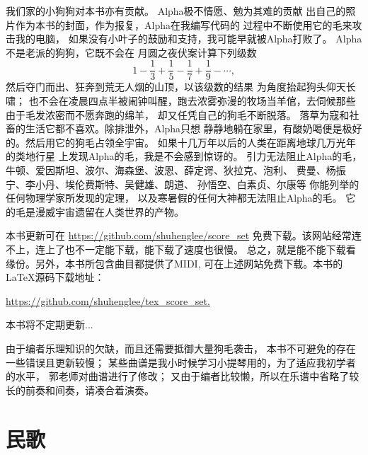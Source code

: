 \documentclass[a4paper,twoside]{memoir}
\begin{document}
我们家的小狗狗对本书亦有贡献。
Alpha极不情愿、勉为其难的贡献
出自己的照片作为本书的封面，作为报复，Alpha在我编写代码的
过程中不断使用它的毛来攻击我的电脑，
如果没有小叶子的鼓励和支持，我可能早就被Alpha打败了。
Alpha不是老派的狗狗，它既不会在
月圆之夜伏案计算下列级数
\begin{equation*}
	1 - \frac{1}{3} + \frac{1}{5} - \frac{1}{7} + \frac{1}{9} - \cdots,
\end{equation*}
然后夺门而出、狂奔到荒无人烟的山顶，以该级数的结果
为角度抬起狗头仰天长啸；
也不会在凌晨四点半被闹钟叫醒，跑去浓雾弥漫的牧场当羊倌，去伺候那些由于毛发浓密而不愿奔跑的绵羊，
却又任凭自己的狗毛不断脱落。
落草为寇和社畜的生活它都不喜欢。除排泄外，Alpha只想
静静地躺在家里，有酸奶喝便是极好的。然后用它的狗毛占领全宇宙。
如果十几万年以后的人类在距离地球几万光年的类地行星
上发现Alpha的毛，我是不会感到惊讶的。
引力无法阻止Alpha的毛，
牛顿、爱因斯坦、波尔、海森堡、波恩、薛定谔、狄拉克、泡利、
费曼、杨振宁、李小丹、埃伦费斯特、吴健雄、朗道、
孙悟空、白素贞、尔康等
你能列举的任何物理学家所发现的定理，
以及寒暑假的任何大神都无法阻止Alpha的毛。
它的毛是漫威宇宙遗留在人类世界的产物。

本书更新可在%
\href{https://github.com/shuhenglee/score\_set}%
{\faGithub https://github.com/shuhenglee/score\_set}
免费下载。该网站经常连不上，连上了也不一定能下载，能下载了速度也很慢。
总之，就是能不能下载看缘份。另外，本书所包含曲目都提供了MIDI,
可在上述网站免费下载。本书的\LaTeX{}源码下载地址：

\href{https://github.com/shuhenglee/tex\_score\_set}%
{\kern-4pt\faCode https://github.com/shuhenglee/tex\_score\_set.}

本书将不定期更新...

由于编者乐理知识的欠缺，而且还需要抵御大量狗毛袭击，
本书不可避免的存在一些错误且更新较慢；
某些曲谱是我小时候学习小提琴用的，为了适应我初学者的水平，
郭老师对曲谱进行了修改；
又由于编者比较懒，所以在乐谱中省略了较长的前奏和间奏，请凑合着演奏。
\vfil\break

\pagecolor{Cornsilk} %
\hypertarget{chap:cont}{}
\tableofcontents
\vfill\break

\mainmatter

\chapter{民歌}

\circlefive
\vfil\break











\end{document}
